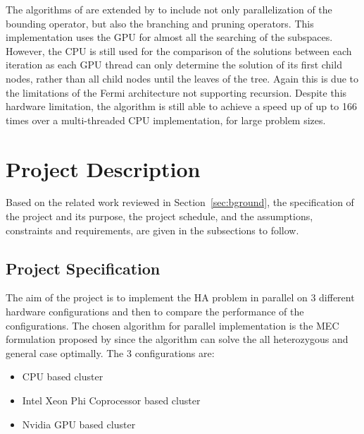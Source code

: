\documentclass[10pt,a4paer,twocolumn]{article}
\begin{document}
The algorithms of \cite{melab:2012, chakroun:2012} are extended by \cite{chakroun:2013} to 
include not only parallelization of the bounding operator, but also the branching and pruning operators. This
implementation uses the GPU for almost all the searching of the subspaces. However, the CPU is still used for the
comparison of the solutions between each iteration as each GPU thread can only determine the solution of its 
first child nodes, rather than all child nodes until the leaves of the tree. Again this is due to the limitations 
of the Fermi architecture not supporting recursion. Despite this hardware limitation, the algorithm is still able
to achieve a speed up of up to 166 times over a multi-threaded CPU implementation, for large problem sizes.


\section{Project Description} \label{sec:projdes}

Based on the related work reviewed in Section~\ref{sec:bground}, the specification of the project and its 
purpose, the project schedule, and the assumptions, constraints and requirements, are given in the 
subsections to follow.

\subsection{ Project Specification } \label{sec:projspec}

The aim of the project is to implement the HA problem in parallel on 3 different hardware configurations and 
then to compare the performance of the configurations. The chosen algorithm for parallel implementation is 
the MEC formulation proposed by \cite{chen:2013} since the algorithm can solve the all heterozygous and 
general case optimally. The 3 configurations are:
\begin{itemize}[noitemsep]
    \item{CPU based cluster}
    \item{Intel Xeon Phi Coprocessor based cluster}
    \item{Nvidia GPU based cluster}
\end{itemize}
\end{document}
